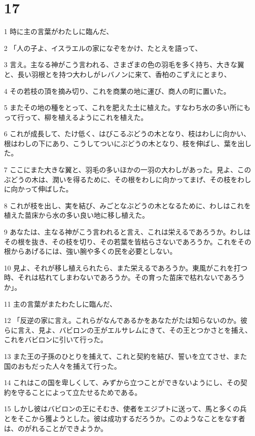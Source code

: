 \chapter{17}

\par 1 時に主の言葉がわたしに臨んだ、
\par 2 「人の子よ、イスラエルの家になぞをかけ、たとえを語って、
\par 3 言え。主なる神がこう言われる、さまざまの色の羽毛を多く持ち、大きな翼と、長い羽根とを持つ大わしがレバノンに来て、香柏のこずえにとまり、
\par 4 その若枝の頂を摘み切り、これを商業の地に運び、商人の町に置いた。
\par 5 またその地の種をとって、これを肥えた土に植えた。すなわち水の多い所にもって行って、柳を植えるようにこれを植えた。
\par 6 これが成長して、たけ低く、はびこるぶどうの木となり、枝はわしに向かい、根はわしの下にあり、こうしてついにぶどうの木となり、枝を伸ばし、葉を出した。
\par 7 ここにまた大きな翼と、羽毛の多いほかの一羽の大わしがあった。見よ、このぶどうの木は、潤いを得るために、その根をわしに向かってまげ、その枝をわしに向かって伸ばした。
\par 8 これが枝を出し、実を結び、みごとなぶどうの木となるために、わしはこれを植えた苗床から水の多い良い地に移し植えた。
\par 9 あなたは、主なる神がこう言われると言え、これは栄えるであろうか。わしはその根を抜き、その枝を切り、その若葉を皆枯らさないであろうか。これをその根からあげるには、強い腕や多くの民を必要としない。
\par 10 見よ、それが移し植えられたら、また栄えるであろうか。東風がこれを打つ時、それは枯れてしまわないであろうか。その育った苗床で枯れないであろうか」。
\par 11 主の言葉がまたわたしに臨んだ、
\par 12 「反逆の家に言え。これらがなんであるかをあなたがたは知らないのか。彼らに言え、見よ、バビロンの王がエルサレムにきて、その王とつかさとを捕え、これをバビロンに引いて行った。
\par 13 また王の子孫のひとりを捕えて、これと契約を結び、誓いを立てさせ、また国のおもだった人々を捕えて行った。
\par 14 これはこの国を卑しくして、みずから立つことができないようにし、その契約を守ることによって立たせるためである。
\par 15 しかし彼はバビロンの王にそむき、使者をエジプトに送って、馬と多くの兵とをそこから獲ようとした。彼は成功するだろうか。このようなことをなす者は、のがれることができようか。
